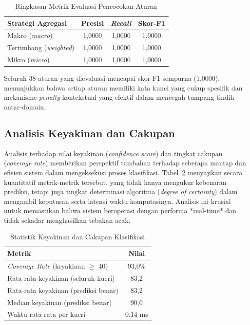 \begin{table}[htbp]
\centering
\caption{Ringkasan Metrik Evaluasi Pencocokan Aturan}
\label{tab:eval-rule-summary}
\begin{tabular}{|p{4.5cm}|c|c|c|}
\hline
\textbf{Strategi Agregasi} & \textbf{Presisi} & \textbf{\textit{Recall}} & \textbf{Skor-F1} \\
\hline
Makro (\textit{macro}) & 1{,}0000 & 1{,}0000 & 1{,}0000 \\
\hline
Tertimbang (\textit{weighted}) & 1{,}0000 & 1{,}0000 & 1{,}0000 \\
\hline
Mikro (\textit{micro}) & 1{,}0000 & 1{,}0000 & 1{,}0000 \\
\hline
\end{tabular}
\end{table}

Seluruh 38 aturan yang dievaluasi mencapai skor-F1 sempurna (1{,}0000), menunjukkan bahwa setiap aturan memiliki kata kunci yang cukup spesifik dan mekanisme \textit{penalty} kontekstual yang efektif dalam mencegah tumpang tindih antar-domain.

\subsection{Analisis Keyakinan dan Cakupan}

Analisis terhadap nilai keyakinan (\textit{confidence score}) dan tingkat cakupan (\textit{coverage rate}) memberikan perspektif tambahan terhadap seberapa mantap dan efisien sistem dalam mengeksekusi proses klasifikasi. Tabel~\ref{tab:eval-confidence} menyajikan secara kuantitatif metrik-metrik tersebut, yang tidak hanya mengukur kebenaran prediksi, tetapi juga tingkat determinasi algoritma (\textit{degree of certainty}) dalam mengambil keputusan serta latensi waktu komputasinya. Analisis ini krusial untuk memastikan bahwa sistem beroperasi dengan performa *real-time* dan tidak sekadar menghasilkan tebakan acak.

\begin{table}[htbp]
\centering
\caption{Statistik Keyakinan dan Cakupan Klasifikasi}
\label{tab:eval-confidence}
\begin{tabular}{|p{7cm}|c|}
\hline
\textbf{Metrik} & \textbf{Nilai} \\
\hline
\textit{Coverage Rate} (keyakinan $\geq$ 40) & 93{,}0\% \\
\hline
Rata-rata keyakinan (seluruh kueri) & 83{,}2 \\
\hline
Rata-rata keyakinan (prediksi benar) & 83{,}2 \\
\hline
Median keyakinan (prediksi benar) & 90{,}0 \\
\hline
Waktu rata-rata per kueri & 0{,}14 ms \\
\hline
\end{tabular}
\end{table}


